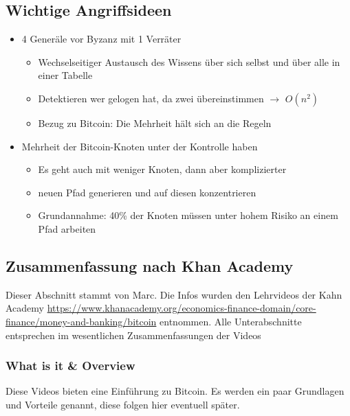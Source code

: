 \documentclass{article} %
\begin{document}
	\subsection{Wichtige Angriffsideen}
		\begin{itemize}
			\item 4 Generäle vor Byzanz mit 1 Verräter
			\begin{itemize}
				\item Wechselseitiger Austausch des Wissens über sich selbst und über alle in einer Tabelle
				\item Detektieren wer gelogen hat, da zwei übereinstimmen $\rightarrow$ $O(n^2)$
				\item Bezug zu Bitcoin: Die Mehrheit hält sich an die Regeln
			\end{itemize}
			\item Mehrheit der Bitcoin-Knoten unter der Kontrolle haben
			\begin{itemize}
				\item Es geht auch mit weniger Knoten, dann aber komplizierter
				\item neuen Pfad generieren und auf diesen konzentrieren
				\item Grundannahme: 40\% der Knoten müssen unter hohem Risiko an einem Pfad arbeiten
			\end{itemize}
		\end{itemize}
	\subsection{Zusammenfassung nach Khan Academy}
	Dieser Abschnitt stammt von Marc.
	Die Infos wurden den Lehrvideos der Kahn Academy \url{https://www.khanacademy.org/economics-finance-domain/core-finance/money-and-banking/bitcoin} entnommen.
	Alle Unterabschnitte entsprechen im wesentlichen Zusammenfassungen der Videos
	\subsubsection{What is it \& Overview}
	Diese Videos bieten eine Einführung zu Bitcoin.
	Es werden ein paar Grundlagen und Vorteile genannt, diese folgen hier eventuell später.
\end{document}
